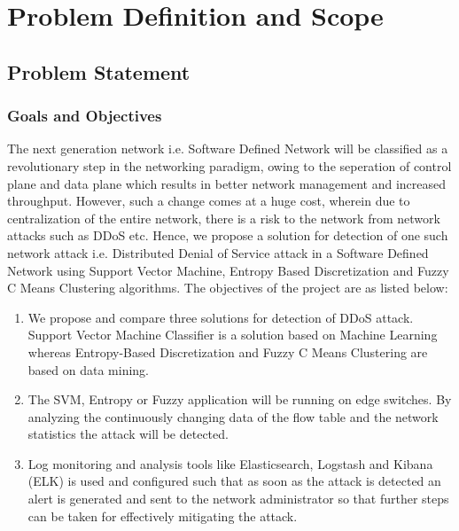 \documentclass[12pt,a4paper,final]{report}
\begin{document}
\chapter{Problem Definition and Scope}
\thispagestyle{empty}
\newpage
\section{Problem Statement}
\subsection{Goals and Objectives}
The next generation network i.e. Software Defined Network will be classified as a revolutionary step in the networking paradigm, owing to the seperation of control plane and data plane which results in better network management and increased throughput. However, such a change comes at a huge cost, wherein due to centralization of the entire network, there is a risk to the network from network attacks such as DDoS etc. Hence, we propose a solution for detection of one such network attack i.e. Distributed Denial of Service attack in a Software Defined Network using Support Vector Machine, Entropy Based Discretization and Fuzzy C Means Clustering algorithms. The objectives of the project are as listed below:

\begin{enumerate}
\item
We propose and compare three solutions for detection of DDoS attack. Support Vector Machine Classifier is a solution based on Machine Learning whereas Entropy-Based Discretization and Fuzzy C Means Clustering are based on data mining.

\item
The SVM, Entropy or Fuzzy application will be running on edge switches. By analyzing the continuously changing data of the flow table and the network statistics the attack will be detected.

\item
Log monitoring and analysis tools like Elasticsearch, Logstash and Kibana (ELK) is used and configured such that as soon as the attack is detected an alert is generated and sent to the network administrator so that further steps can be taken for effectively mitigating the attack.
\end{enumerate}
\end{document}
